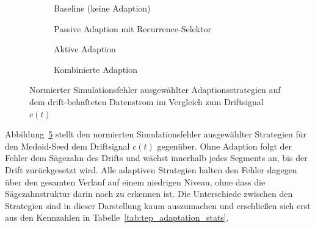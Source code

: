 \begin{figure}[tbp]
    \centering
    \begin{subfigure}[t]{\textwidth}
        \centering
        
        \caption{Baseline (keine Adaption)}
        \label{fig:tep_adaptation_baseline}
    \end{subfigure}

    \begin{subfigure}[t]{\textwidth}
        \centering
        
        \caption{Passive Adaption mit Recurrence-Selektor}
        \label{fig:tep_adaptation_blind_rec}
    \end{subfigure}

    \begin{subfigure}[t]{\textwidth}
        \centering
        
        \caption{Aktive Adaption}
        \label{fig:tep_adaptation_informed}
    \end{subfigure}

    \begin{subfigure}[t]{\textwidth}
        \centering
        
        \caption{Kombinierte Adaption}
        \label{fig:tep_adaptation_combined}
    \end{subfigure}
    \caption{Normierter Simulationsfehler ausgewählter Adaptionsstrategien auf dem drift-behafteten Datenstrom im Vergleich zum Driftsignal $c(t)$}
    \label{fig:tep_adaptation_comparison}
\end{figure}
%
Abbildung~\ref{fig:tep_adaptation_comparison} stellt den normierten Simulationsfehler ausgewählter Strategien für den Medoid-Seed dem Driftsignal $c(t)$ gegenüber. Ohne Adaption folgt der Fehler dem Sägezahn des Drifts und wächst innerhalb jedes Segments an, bis der Drift zurückgesetzt wird. Alle adaptiven Strategien halten den Fehler dagegen über den gesamten Verlauf auf einem niedrigen Niveau, ohne dass die Sägezahnstruktur darin noch zu erkennen ist. Die Unterschiede zwischen den Strategien sind in dieser Darstellung kaum auszumachen und erschließen sich erst aus den Kennzahlen in Tabelle~\ref{tab:tep_adaptation_stats}. \par
%
\providecommand{\adaptpm}[2]{$#1 \pm #2$}
